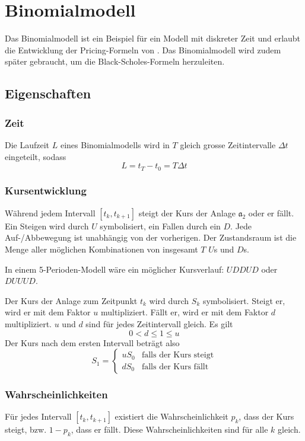 \documentclass[11pt]{report} %
\begin{document}
\section{Binomialmodell}
Das Binomialmodell ist ein Beispiel für ein Modell mit diskreter Zeit und erlaubt die Entwicklung der Pricing-Formeln von \textcite{Cox1979}. Das Binomialmodell wird zudem später gebraucht, um die Black-Scholes-Formeln herzuleiten.
\subsection{Eigenschaften}
\subsubsection*{Zeit}
Die Laufzeit $L$ eines Binomialmodells wird in $T$ gleich grosse Zeitintervalle $\Delta t$ eingeteilt, sodass $$L=t_T-t_0=T\Delta t$$
\subsubsection*{Kursentwicklung}
Während jedem Intervall $[t_k, t_{k+1}]$ steigt der Kurs der Anlage $\mathfrak{a}_2$ oder er fällt. Ein Steigen wird durch $U$ symbolisiert, ein Fallen durch ein $D$. Jede Auf-/Abbewegung ist unabhängig von der vorherigen. Der Zustandsraum ist die Menge aller möglichen Kombinationen von insgesamt $T$ $U$s und $D$s.
\begin{Beispiel}{}{}
    In einem 5-Perioden-Modell wäre ein möglicher Kursverlauf: $UDDUD$ oder $DUUUD$.
\end{Beispiel}
Der Kurs der Anlage zum Zeitpunkt $t_k$ wird durch $S_k$ symbolisiert. Steigt er, wird er mit dem Faktor $u$ multipliziert. Fällt er, wird er mit dem Faktor $d$ multipliziert. $u$ und $d$ sind für jedes Zeitintervall gleich. Es gilt $$0<d\leq1\leq u$$
Der Kurs nach dem ersten Intervall beträgt also
\begin{equation*}
    S_1=\begin{cases}
        uS_0 &\text{falls der Kurs steigt}\\
        dS_0 &\text{falls der Kurs fällt}
    \end{cases}
\end{equation*}
\subsubsection*{Wahrscheinlichkeiten}
Für jedes Intervall $[t_k, t_{k+1}]$ existiert die Wahrscheinlichkeit $p_k$, dass der Kurs steigt, bzw. $1-p_k$, dass er fällt. Diese Wahrscheinlichkeiten sind für alle $k$ gleich.
\end{document}
